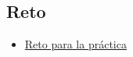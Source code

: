\documentclass[]{article}
\providecommand{\tightlist}{%
  \setlength{\itemsep}{0pt}\setlength{\parskip}{0pt}}
\begin{document}
\hypertarget{reto}{%
\subsection{Reto}\label{reto}}

\begin{itemize}
\tightlist
\item
  \href{reto.md}{Reto para la práctica}
\end{itemize}
\end{document}
